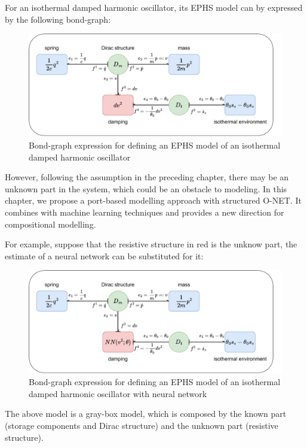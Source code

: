 \documentclass[
	parskip, 			   %
	twoside, 			   %
	DIV=14, 			   %
	BCOR=15.0mm, 		   %
	headsepline, 		   %
	open=right, 		   %
	captions=tableheading, %
	bibliography=totoc,    %
	numbers=noenddot       %
]{scrreprt}
\begin{document}
For an isothermal damped harmonic oscillator, its EPHS model can by expressed by the following bond-graph:

\begin{figure}[h!]
    \centering
    \includegraphics[scale=0.6]{figures/bondgraph_idho_exergetic.pdf}
    \caption{Bond-graph expression for defining an EPHS model of an isothermal damped harmonic oscillator}
    \label{fig:bondgraph_idho_exergetic}
\end{figure}

However, following the assumption in the preceding chapter, there may be an unknown part in the system, which could be an obstacle to modeling. In this chapter, we propose a port-based modelling approach with structured O-NET. It combines with machine learning techniques and provides a new direction for compositional modelling.

For example, suppose that the resistive structure in red is the unknow part, the estimate of a neural network can be substituted for it:

\clearpage
\begin{figure}[h!]
    \centering
    \includegraphics[scale=0.6]{figures/bondgraph_idho_exergetic_NN.pdf}
    \caption{Bond-graph expression for defining an EPHS model of an isothermal damped harmonic oscillator with neural network}
    \label{fig:bondgraph_idho_exergetic_NN}
\end{figure}

The above model is a gray-box model, which is composed by the known part (storage components and Dirac structure) and the unknown part (resistive structure).
\end{document}

